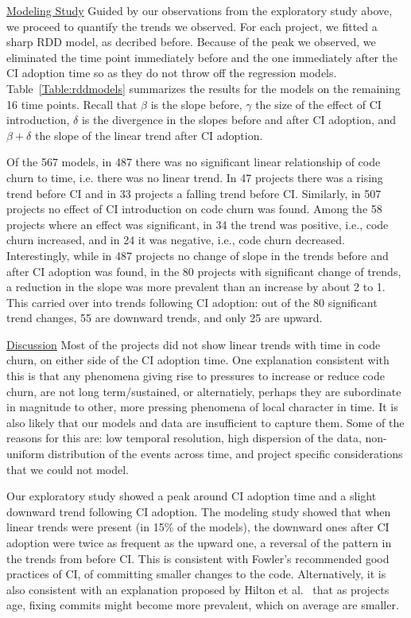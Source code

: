\noindent \underline{Modeling Study} 
Guided by our observations from the exploratory study above, we proceed to quantify the trends we observed.
For each project, we fitted a sharp RDD model, as decribed before.
Because of the peak we observed, we eliminated the time point immediately before and the one immediately after the CI adoption time so as they do not throw off the regression models.
Table~\ref{Table:rddmodels} summarizes the results for the models on the remaining 16 time points.
Recall that $\beta$ is the slope before, $\gamma$ the size of the effect of CI introduction, $\delta$ is the divergence in the slopes before and after CI adoption, and $\beta + \delta$ the slope of the linear trend after CI adoption.

Of the 567 models, in 487  there was no significant linear relationship of code churn to time, i.e. there was no linear trend.
In 47 projects there was a rising trend before CI and in 33 projects a falling trend before CI.
Similarly, in 507 projects no effect of CI introduction on code churn was found. Among the 58 projects where an effect was significant, in 34 the trend was positive, i.e., code churn increased, and in 24 it was negative, i.e., code churn decreased.
Interestingly, while in 487 projects no change of slope in the trends before and after CI adoption was found, in the 80 projects with significant change of trends, a reduction in the slope was more prevalent than an increase by about 2 to 1.
This carried over into trends following CI adoption: out of the 80 significant trend changes, 55 are downward trends, and only 25 are upward.



\noindent \underline{Discussion}
Most of the projects did not show linear trends with time in code churn, on either side of the CI adoption time.
One explanation consistent with this is that any phenomena giving rise to pressures to increase or reduce code churn, are not long term/sustained, or alternatiely, perhaps they are subordinate in magnitude to other, more pressing phenomena of local character in time.  
It is also likely that our models and data are insufficient to capture them.
Some of the reasons for this are: low temporal resolution, high dispersion of the data,
non-uniform distribution of the events across time, and project specific considerations that we could not model.

Our exploratory study showed a peak around CI adoption time and a slight downward trend following CI adoption.
The modeling study showed that when linear trends were present (in 15\% of the models), the downward ones after CI adoption were twice  as frequent as the upward one, a reversal of the pattern in the trends from before CI.
This is consistent with Fowler's recommended good practices of CI, of committing smaller changes to the code.
Alternatively, it is also consistent with an explanation proposed by Hilton et al.~\cite{Hilton2016} that as projects age, fixing commits might become more prevalent, which on average are smaller.

